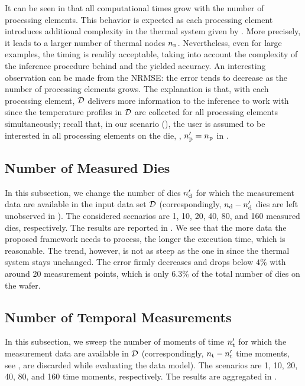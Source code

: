 It can be seen in  that all computational times grow with the number of processing elements. This behavior is expected as each processing element introduces additional complexity in the thermal system given by . More precisely, it leads to a larger number of thermal nodes ${n_\text{n}}$. Nevertheless, even for large examples, the timing is readily acceptable, taking into account the complexity of the inference procedure behind and the yielded accuracy.
An interesting observation can be made from the NRMSE: the error tends to decrease as the number of processing elements grows. The explanation is that, with each processing element, $\mathcal{D}$ delivers more information to the inference to work with since the temperature profiles in $\mathcal{D}$ are collected for all processing elements simultaneously; recall that, in our scenario (), the user is assumed to be interested in all processing elements on the die, \ie, ${n_\text{p}'} = {n_\text{p}}$ in .

\subsection{Number of Measured Dies}

In this subsection, we change the number of dies ${n_\text{d}'}$ for which the measurement data are available in the input data set $\mathcal{D}$ (correspondingly, ${n_\text{d}} - {n_\text{d}'}$ dies are left unobserved in ). The considered scenarios are 1, 10, 20, 40, 80, and 160 measured dies, respectively. The results are reported in .
We see that the more data the proposed framework needs to process, the longer the execution time, which is reasonable. The trend, however, is not as steep as the one in  since the thermal system stays unchanged.
The error firmly decreases and drops below $4\%$ with around 20 measurement points, which is only $6.3\%$ of the total number of dies on the wafer.

\subsection{Number of Temporal Measurements}
In this subsection, we sweep the number of moments of time ${n_\text{t}'}$ for which the measurement data are available in $\mathcal{D}$ (correspondingly, ${n_\text{t}} - {n_\text{t}'}$ time moments, see , are discarded while evaluating the data model). The scenarios are 1, 10, 20, 40, 80, and 160 time moments, respectively. The results are aggregated in .


